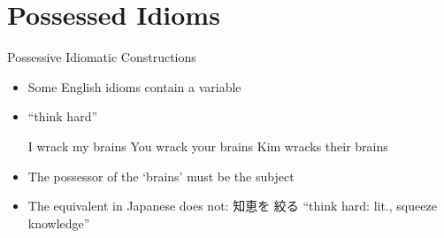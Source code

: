 \newcommand{\DF}[1]{#1}
\newcommand{\avmspan}[1]{\type*{\scriptsize #1}}
\section{Possessed Idioms}
\begin{frame}{Possessive Idiomatic Constructions}

  \begin{itemize}
  \item Some English idioms contain a variable
  \item  {}
``think hard''
    \begin{exe}
      \ex I wrack my brains
      \ex You wrack your brains
      \ex Kim wracks their brains
    \end{exe}
  \item The possessor of the `brains' must be the subject
  \item The equivalent in Japanese does not: 知恵を 絞る  ``think hard: lit., squeeze knowledge''
  \end{itemize}
  
\end{frame}

